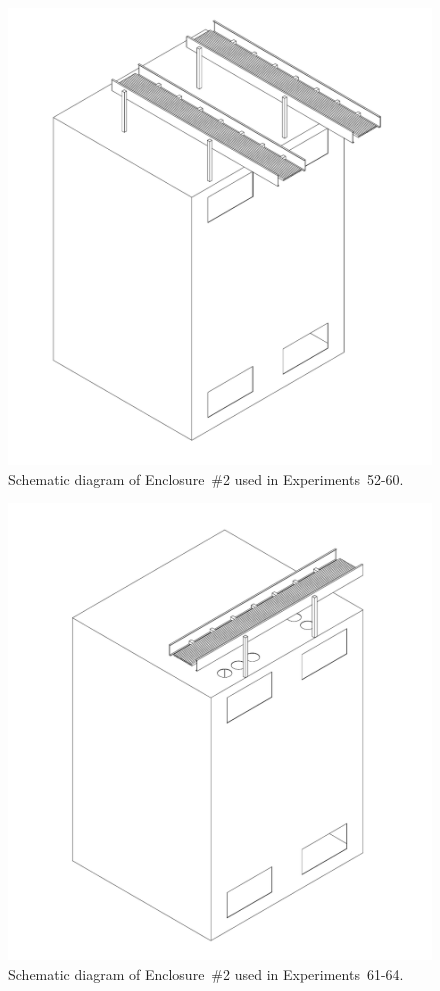 \begin{figure}[!ht]
\includegraphics[width=6.5in]{../FIGURES/Cabinet_2_with_Tray}
\caption[Schematic diagram of Tests 52-60]{Schematic diagram of Enclosure~\#2 used in Experiments~52-60.}
\label{fig:Cabinet_2_3D}
\end{figure}

\begin{figure}[!ht]
\includegraphics[width=6.5in]{../FIGURES/Cabinet_2_with_Tray_Holes}
\caption[Schematic diagram of Tests 61-64]{Schematic diagram of Enclosure~\#2 used in Experiments~61-64.}
\label{fig:Cabinet_2_3D_Holes}
\end{figure}



